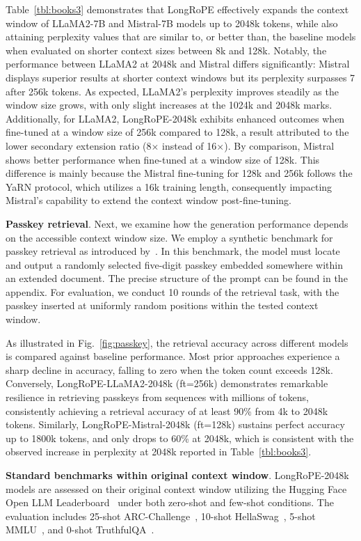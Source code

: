 Table~\ref{tbl:books3} demonstrates that LongRoPE effectively expands the context window of LLaMA2-7B and Mistral-7B models up to 2048k tokens, while also attaining perplexity values that are similar to, or better than, the baseline models when evaluated on shorter context sizes between 8k and 128k. Notably, the performance between LLaMA2 at 2048k and Mistral differs significantly: Mistral displays superior results at shorter context windows but its perplexity surpasses 7 after 256k tokens. As expected, LLaMA2's perplexity improves steadily as the window size grows, with only slight increases at the 1024k and 2048k marks. Additionally, for LLaMA2, LongRoPE-2048k exhibits enhanced outcomes when fine-tuned at a window size of 256k compared to 128k, a result attributed to the lower secondary extension ratio (8$\times$ instead of 16$\times$). By comparison, Mistral shows better performance when fine-tuned at a window size of 128k. This difference is mainly because the Mistral fine-tuning for 128k and 256k follows the YaRN protocol, which utilizes a 16k training length, consequently impacting Mistral's capability to extend the context window post-fine-tuning.

\textbf{Passkey retrieval}. Next, we examine how the generation performance depends on the accessible context window size. We employ a synthetic benchmark for passkey retrieval as introduced by~\cite{passkey}. In this benchmark, the model must locate and output a randomly selected five-digit passkey embedded somewhere within an extended document. The precise structure of the prompt can be found in the appendix. For evaluation, we conduct 10 rounds of the retrieval task, with the passkey inserted at uniformly random positions within the tested context window.

As illustrated in Fig.~\ref{fig:passkey}, the retrieval accuracy across different models is compared against baseline performance. Most prior approaches experience a sharp decline in accuracy, falling to zero when the token count exceeds 128k. Conversely, LongRoPE-LLaMA2-2048k (ft=256k) demonstrates remarkable resilience in retrieving passkeys from sequences with millions of tokens, consistently achieving a retrieval accuracy of at least 90\% from 4k to 2048k tokens. Similarly, LongRoPE-Mistral-2048k (ft=128k) sustains perfect accuracy up to 1800k tokens, and only drops to 60\% at 2048k, which is consistent with the observed increase in perplexity at 2048k reported in Table~\ref{tbl:books3}.

\textbf{Standard benchmarks within original context window}. LongRoPE-2048k models are assessed on their original context window utilizing the Hugging Face Open LLM Leaderboard~\cite{huggingfaceboard} under both zero-shot and few-shot conditions. The evaluation includes 25-shot ARC-Challenge~\cite{allenai:arc}, 10-shot HellaSwag~\cite{zellers2019hellaswag}, 5-shot MMLU~\cite{mmlu}, and 0-shot TruthfulQA~\cite{lin2021truthfulqa}.


